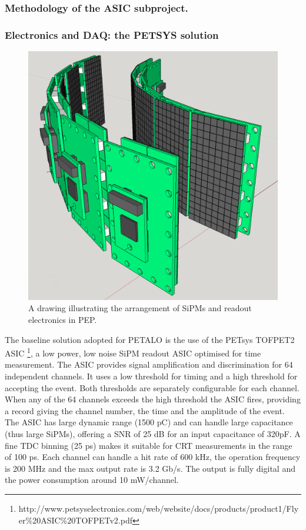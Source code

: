 \subsubsection*{Methodology of the ASIC subproject.}

\subsubsection*{Electronics and DAQ: the PETSYS solution}
%
\begin{figure}[!htb]
	\centering
	\includegraphics[scale=0.25]{img/PEP.png}
	\caption{\label{fig.pep} A drawing illustrating the arrangement of SiPMs and readout electronics in PEP. }
	\end{figure}

The baseline solution adopted for PETALO is the use of the PETsys TOFPET2 ASIC 
\footnote{http://www.petsyselectronics.com/web/website/docs/products/product1/Flyer\%20ASIC\%20TOFPETv2.pdf}, a low power, low noise SiPM readout ASIC
optimised for  time measurement. The ASIC provides signal amplification and discrimination for 64 independent channels. It uses a low threshold
for  timing and a high threshold for accepting the event. Both thresholds are separately configurable for each channel. When any of the 64 channels exceeds the high threshold the ASIC fires, providing a record giving the channel number, the time and the amplitude of the event. The ASIC has large dynamic range (1500 pC) and can handle large
capacitance (thus large SiPMs), offering a SNR of 25 dB for an
input capacitance of 320pF. A fine TDC binning (25 ps) makes it suitable for CRT measurements in the range
of 100 ps. Each channel can handle a hit rate of 600 kHz, the operation frequency is 200 MHz and the max output
rate is 3.2 Gb/s. The output is fully digital and the power consumption around 10 mW/channel. 

